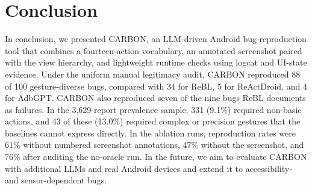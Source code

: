 \documentclass[10pt,conference,a4paper]{IEEEtran}
\begin{document}
  \section{Conclusion}
  \label{sec:conclusion}

  In conclusion, we presented CARBON, an LLM-driven Android
  bug-reproduction tool that combines a fourteen-action vocabulary, an
  annotated screenshot paired with the view hierarchy, and lightweight runtime
  checks using logcat and UI-state evidence. Under the uniform manual legitimacy
  audit, CARBON reproduced 88 of 100 gesture-diverse bugs, compared with 34
  for ReBL, 5 for ReActDroid, and 4 for AdbGPT. CARBON also reproduced seven
  of the nine bugs ReBL documents as failures. In the 3{,}629-report prevalence
  sample, 331 (9.1\%) required non-basic actions, and 43 of these (13.0\%)
  required complex or precision gestures that the baselines cannot express
  directly. In the ablation runs, reproduction rates were 61\% without
  numbered screenshot annotations, 47\% without the screenshot, and 76\% after auditing the
  no-oracle run. In the future, we aim to evaluate CARBON with additional LLMs
  and real Android devices and extend it to accessibility- and sensor-dependent
  bugs.
\end{document}
